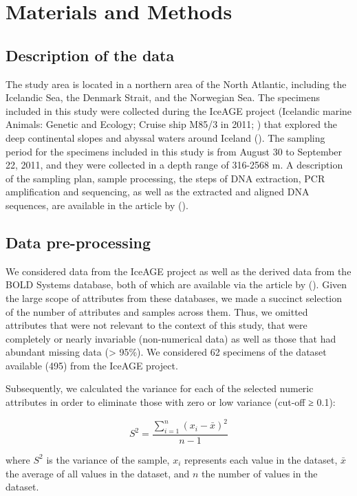 \section{Materials and Methods}\label{materials-methods}

\subsection{Description of the data}
The study area is located in a northern area of the North Atlantic, including the Icelandic Sea, the Denmark Strait, and the Norwegian Sea. The specimens included in this study were collected during the IceAGE project (Icelandic marine Animals: Genetic and Ecology; Cruise ship M85/3 in 2011; \citep{brix_iceage_2014}) that explored the deep continental slopes and abyssal waters around Iceland (\citep{meisner_prefacebiodiversity_2018}). The sampling period for the specimens included in this study is from August 30 to September 22, 2011, and they were collected in a depth range of 316-2568 m. A description of the sampling plan, sample processing, the steps of DNA extraction, PCR amplification and sequencing, as well as the extracted and aligned DNA sequences, are available in the article by (\citep{uhlir_adding_2021}).

\subsection{Data pre-processing}
We considered data from the IceAGE project as well as the derived data from the BOLD Systems database, both of which are available via the article by (\citep{uhlir_adding_2021}). Given the large scope of attributes from these databases, we made a succinct selection of the number of attributes and samples across them. Thus, we omitted attributes that were not relevant to the context of this study, that were completely or nearly invariable (non-numerical data) as well as those that had abundant missing data (> 95\%). We considered 62 specimens of the dataset available (495) from the IceAGE project.

Subsequently, we calculated the variance for each of the selected numeric attributes in order to eliminate those with zero or low variance (cut-off ≥ 0.1):

\begin{equation}
S^2 = \frac{\sum_{i=1}^{n} (x_i - \bar{x})^2}{n-1}
\end{equation}

where \( S^2 \) is the variance of the sample, \( x_i \) represents each value in the dataset, \( \bar{x} \) the average of all values in the dataset, and \( n \) the number of values in the dataset.

